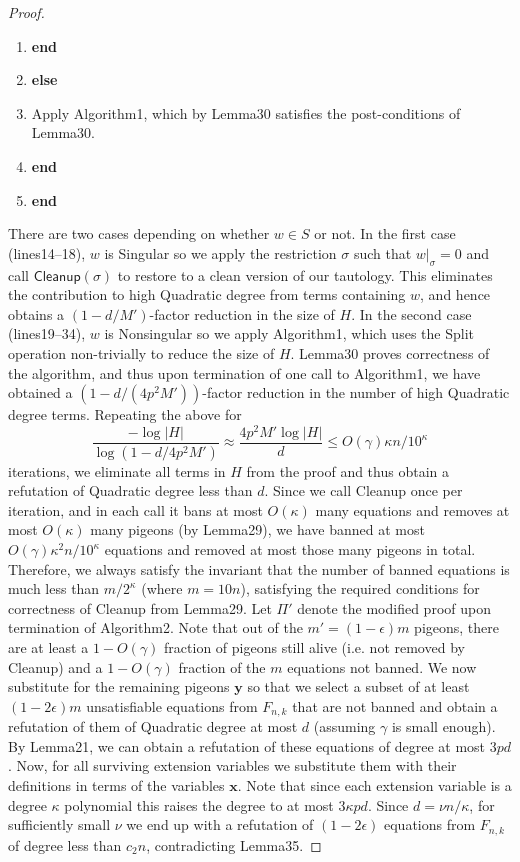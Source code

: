 \documentclass[10pt,a4paper]{article}
\begin{document}
\begin{proof}
\begin{enumerate}[label=\arabic*,leftmargin=*]
\item \textbf{end}
\item \textbf{else}
\item Apply Algorithm1, which by Lemma30 satisfies the post-conditions of Lemma30.
\item \textbf{end}
\item \textbf{end}
\end{enumerate}
There are two cases depending on whether $w\in S$ or not. In the first case (lines14–18), $w$ is Singular so we apply the restriction $\sigma$ such that $w|_{\sigma}=0$ and call $\mathsf{Cleanup}(\sigma)$ to restore to a clean version of our tautology. This eliminates the contribution to high Quadratic degree from terms containing $w$, and hence obtains a $(1-d/M')$-factor reduction in the size of $H$. In the second case (lines19–34), $w$ is Nonsingular so we apply Algorithm1, which uses the Split operation non-trivially to reduce the size of $H$. Lemma30 proves correctness of the algorithm, and thus upon termination of one call to Algorithm1, we have obtained a $(1-d/(4p^2M'))$-factor reduction in the number of high Quadratic degree terms.
Repeating the above for
\[\frac{-\log|H|}{\log(1-d/4p^2M')}\approx\frac{4p^2M'\log|H|}{d}\leq O(\gamma)\kappa n/10^{\kappa}\]
iterations, we eliminate all terms in $H$ from the proof and thus obtain a refutation of Quadratic degree less than $d$. Since we call Cleanup once per iteration, and in each call it bans at most $O(\kappa)$ many equations and removes at most $O(\kappa)$ many pigeons (by Lemma29), we have banned at most $O(\gamma)\kappa^2n/10^{\kappa}$ equations and removed at most those many pigeons in total. Therefore, we always satisfy the invariant that the number of banned equations is much less than $m/2^{\kappa}$ (where $m=10n$), satisfying the required conditions for correctness of Cleanup from Lemma29.
Let $\Pi'$ denote the modified proof upon termination of Algorithm2. Note that out of the $m'=(1-\epsilon)m$ pigeons, there are at least a $1-O(\gamma)$ fraction of pigeons still alive (i.e. not removed by Cleanup) and a $1-O(\gamma)$ fraction of the $m$ equations not banned. We now substitute for the remaining pigeons $\mathbf y$ so that we select a subset of at least $(1-2\epsilon)m$ unsatisfiable equations from $F_{n,k}$ that are not banned and obtain a refutation of them of Quadratic degree at most $d$ (assuming $\gamma$ is small enough). By Lemma21, we can obtain a refutation of these equations of degree at most $3pd$. Now, for all surviving extension variables we substitute them with their definitions in terms of the variables $\mathbf x$. Note that since each extension variable is a degree $\kappa$ polynomial this raises the degree to at most $3\kappa pd$. Since $d=\nu n/\kappa$, for sufficiently small $\nu$ we end up with a refutation of $(1-2\epsilon)$ equations from $F_{n,k}$ of degree less than $c_2n$, contradicting Lemma35.
\end{proof}
\end{document}
